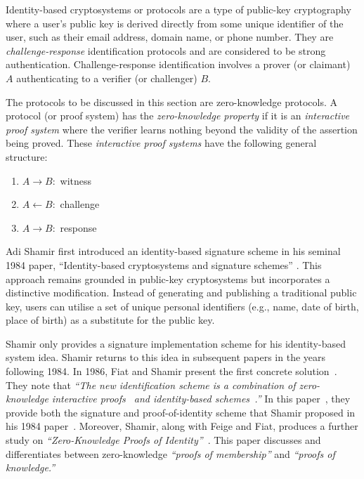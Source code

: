 Identity-based cryptosystems or protocols are a type of public-key cryptography where a user's public key is derived directly from some unique identifier of the user, such as their email address, domain name, or phone number. They are \textit{challenge-response} identification protocols and are considered to be strong authentication. Challenge-response identification involves a prover (or claimant) $A$ authenticating to a verifier (or challenger) $B$. 


The protocols to be discussed in this section are zero-knowledge protocols. A protocol (or proof system) has the \textit{zero-knowledge property} if it is an \textit{interactive proof system} where the verifier learns nothing beyond the validity of the assertion being proved. These \textit{interactive proof systems} have the following general structure:

\begin{enumerate}
    \item $A \rightarrow B:$ witness
    \item $A \leftarrow B:$ challenge
    \item $A \rightarrow B:$ response
\end{enumerate}

Adi Shamir first introduced an identity-based signature scheme in his seminal 1984 paper, ``Identity-based cryptosystems and signature schemes'' \cite{shamir_identity-based_1984}. This approach remains grounded in public-key cryptosystems but incorporates a distinctive modification. Instead of generating and publishing a traditional public key, users can utilise a set of unique personal identifiers (e.g., name, date of birth, place of birth) as a substitute for the public key. 

Shamir only provides a signature implementation scheme for his identity-based system idea. Shamir returns to this idea in subsequent papers in the years following 1984. In 1986, Fiat and Shamir present the first concrete solution~\cite{fiat_how_1986}. They note that \emph{``The new identification scheme is a combination of zero-knowledge interactive proofs~\cite{goldwasser_knowledge_1985} and identity-based schemes~\cite{shamir_identity-based_1984}.''} In this paper~\cite{fiat_how_1986}, they provide both the signature and proof-of-identity scheme that Shamir proposed in his 1984 paper~\cite{shamir_identity-based_1984}. Moreover, Shamir, along with Feige and Fiat, produces a further study on \emph{``Zero-Knowledge Proofs of Identity''}~\cite{feige_zero-knowledge_1988}. This paper discusses and differentiates between zero-knowledge \emph{``proofs of membership''} and \emph{``proofs of knowledge.''}

